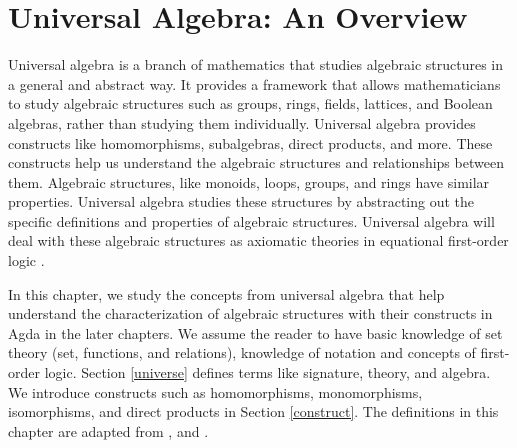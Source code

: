 \chapter{Universal Algebra: An Overview}
\label{start}
Universal algebra is a branch of mathematics that studies algebraic structures
in a general and abstract way. It provides a framework that allows
mathematicians to study algebraic structures such as groups, rings, fields,
lattices, and Boolean algebras, rather than studying them individually.
Universal algebra provides constructs like homomorphisms, subalgebras, direct
products, and more. These constructs help us understand the algebraic structures
and relationships between them. Algebraic structures, like monoids, loops,
groups, and rings have similar properties. Universal algebra studies these
structures by abstracting out the specific definitions and properties of
algebraic structures. Universal algebra will deal with these algebraic
structures as axiomatic theories in equational first-order logic
\cite{YSharoda}. 

In this chapter, we study the concepts from universal algebra that help
understand the characterization of algebraic structures with their constructs in
Agda in the later chapters. We assume the reader to have basic knowledge of set
theory (set, functions, and relations), knowledge of notation and concepts of
first-order logic. Section \ref{universe} defines terms like signature, theory,
and algebra. We introduce constructs such as homomorphisms, monomorphisms,
isomorphisms, and direct products in Section \ref{construct}. The definitions in
this chapter are adapted from \cite{sankappanavar1981course},
\cite{wechler2012universal} and \cite{sannella2012foundations}. 

